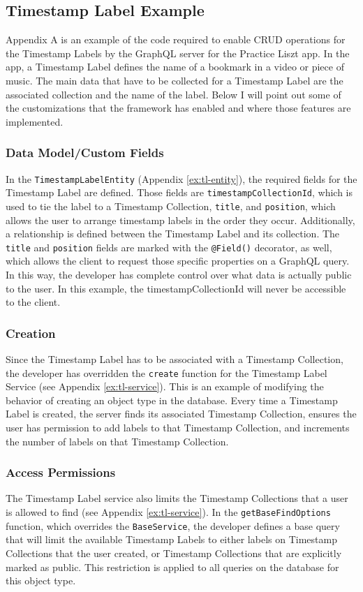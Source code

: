 \subsection{Timestamp Label Example}
Appendix A is an example of the code required to enable CRUD operations for the Timestamp Labels by the GraphQL server for the Practice Liszt app.  In the app, a Timestamp Label defines the name of a bookmark in a video or piece of music.  The main data that have to be collected for a Timestamp Label are the associated collection and the name of the label.  Below I will point out some of the customizations that the framework has enabled and where those features are implemented.

\subsubsection{Data Model/Custom Fields}
In the \verb!TimestampLabelEntity! (Appendix \ref{ex:tl-entity}), the required fields for the Timestamp Label are defined.  Those fields are \verb!timestampCollectionId!, which is used to tie the label to a Timestamp Collection, \verb!title!, and \verb!position!, which allows the user to arrange timestamp labels in the order they occur.  Additionally, a relationship is defined between the Timestamp Label and its collection.  The \verb!title! and \verb!position! fields are marked with the \verb!@Field()! decorator, as well, which allows the client to request those specific properties on a GraphQL query.  In this way, the developer has complete control over what data is actually public to the user.  In this example, the timestampCollectionId will never be accessible to the client.

\subsubsection{Creation}
Since the Timestamp Label has to be associated with a Timestamp Collection, the developer has overridden the \verb!create! function for the Timestamp Label Service (see Appendix \ref{ex:tl-service}). This is an example of modifying the behavior of creating an object type in the database.  Every time a Timestamp Label is created, the server finds its associated Timestamp Collection, ensures the user has permission to add labels to that Timestamp Collection, and increments the number of labels on that Timestamp Collection.

\subsubsection{Access Permissions}
The Timestamp Label service also limits the Timestamp Collections that a user is allowed to find (see Appendix \ref{ex:tl-service}).  In the \verb!getBaseFindOptions! function, which overrides the \verb!BaseService!, the developer defines a base query that will limit the available Timestamp Labels to either labels on Timestamp Collections that the user created, or Timestamp Collections that are explicitly marked as public.  This restriction is applied to all queries on the database for this object type.

